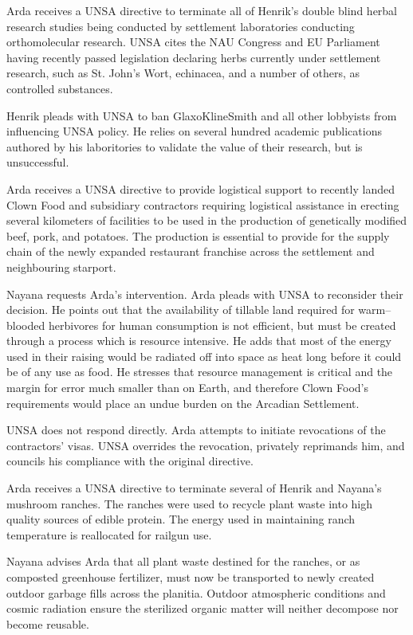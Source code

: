 Arda receives a UNSA directive to terminate all of Henrik's double blind herbal research studies being conducted by settlement laboratories conducting orthomolecular research. UNSA cites the NAU Congress and EU Parliament having recently passed legislation declaring herbs currently under settlement research, such as St. John's Wort, echinacea, and a number of others, as controlled substances.

Henrik pleads with UNSA to ban GlaxoKlineSmith and all other lobbyists from influencing UNSA policy. He relies on several hundred academic publications authored by his laboritories to validate the value of their research, but is unsuccessful.
\StopTimelineDate

Arda receives a UNSA directive to provide logistical support to recently landed Clown Food and subsidiary contractors requiring logistical assistance in erecting several kilometers of facilities to be used in the production of genetically modified beef, pork, and potatoes. The production is essential to provide for the supply chain of the newly expanded restaurant franchise across the settlement and neighbouring starport.

Nayana requests Arda's intervention. Arda pleads with UNSA to reconsider their decision. He points out that the availability of tillable land required for warm--blooded herbivores for human consumption is not efficient, but must be created through a process which is resource intensive. He adds that most of the energy used in their raising would be radiated off into space as heat long before it could be of any use as food. He stresses that resource management is critical and the margin for error much smaller than on Earth, and therefore Clown Food's requirements would place an undue burden on the Arcadian Settlement.

UNSA does not respond directly. Arda attempts to initiate revocations of the contractors' visas. UNSA overrides the revocation, privately reprimands him, and councils his compliance with the original directive.
\StopTimelineDate

Arda receives a UNSA directive to terminate several of Henrik and Nayana's mushroom ranches. The ranches were used to recycle plant waste into high quality sources of edible protein. The energy used in maintaining ranch temperature is reallocated for railgun use. 

Nayana advises Arda that all plant waste destined for the ranches, or as composted greenhouse fertilizer, must now be transported to newly created outdoor garbage fills across the planitia. Outdoor atmospheric conditions and cosmic radiation ensure the sterilized organic matter will neither decompose nor become reusable.
\StopTimelineDate

